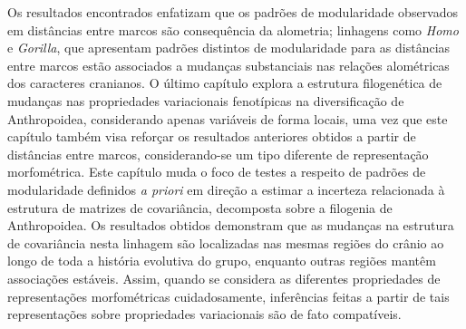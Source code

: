 Os resultados encontrados enfatizam que os padrões de modularidade observados em distâncias entre marcos são consequência da alometria; linhagens como \emph{Homo} e \emph{Gorilla}, que apresentam padrões distintos de modularidade para as distâncias entre marcos estão associados a mudanças substanciais nas relações alométricas dos caracteres cranianos.
O último capítulo explora a estrutura filogenética de mudanças nas propriedades variacionais fenotípicas na diversificação de Anthropoidea, considerando apenas variáveis de forma locais, uma vez que este capítulo também visa reforçar os resultados anteriores obtidos a partir de distâncias entre marcos, considerando-se um tipo diferente de representação morfométrica.
Este capítulo muda o foco de testes a respeito de padrões de modularidade definidos \emph{a priori} em direção a estimar a incerteza relacionada à estrutura de matrizes de covariância,  decomposta sobre a filogenia de Anthropoidea.
Os resultados obtidos demonstram que as mudanças na estrutura de covariância nesta linhagem são localizadas nas mesmas regiões do crânio ao longo de toda a história evolutiva do grupo, enquanto outras regiões mantêm associações estáveis.
Assim, quando se considera as diferentes propriedades de representações morfométricas cuidadosamente, inferências feitas a partir de tais representações sobre propriedades variacionais são de fato compatíveis.